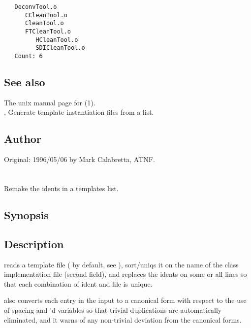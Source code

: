\begin{verbatim}
   DeconvTool.o
      CCleanTool.o
      CleanTool.o
      FTCleanTool.o
         HCleanTool.o
         SDICleanTool.o
   Count: 6
\end{verbatim}

\subsection*{See also}

The unix manual page for (1).\\
, Generate template instantiation files from a list.

\subsection*{Author}

Original: 1996/05/06 by Mark Calabretta, ATNF.


\newpage
\section{}
\label{reident}

Remake the idents in a templates list.

\subsection*{Synopsis}

\begin{synopsis}
\end{synopsis}

\subsection*{Description}

 reads a template file ( by default, see
), sort/uniqs it on the name of the class implementation
 file (second field), and replaces the idents on some or all lines
so that each combination of ident and  file is unique.

 also converts each entry in the input to a canonical form with
respect to the use of spacing and 'd variables so that trivial
duplications are automatically eliminated, and it warns of any non-trivial
deviation from the canonical forms.


